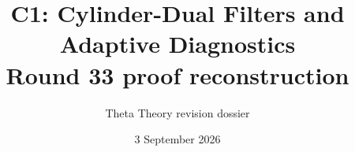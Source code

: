 \documentclass[11pt]{article}
\title{C1: Cylinder-Dual Filters and Adaptive Diagnostics\\\large Round 33 proof reconstruction}
\author{Theta Theory revision dossier}
\date{3 September 2026}
\begin{document}
\maketitle
\reviewnote

\end{document}
